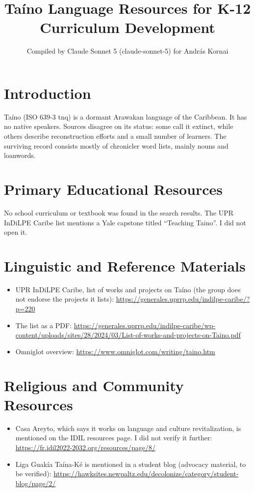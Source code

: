 \documentclass[12pt]{article}
\title{Ta\'ino Language Resources for K-12 Curriculum Development}
\author{Compiled by Claude Sonnet 5 (claude-sonnet-5) for Andr\'as Kornai}
\date{}
\begin{document}
\maketitle

\section{Introduction}
Ta\'ino (ISO 639-3 tnq) is a dormant Arawakan language of the Caribbean. It has no native speakers. Sources disagree on its status: some call it extinct, while others describe reconstruction efforts and a small number of learners. The surviving record consists mostly of chronicler word lists, mainly nouns and loanwords.

\section{Primary Educational Resources}
No school curriculum or textbook was found in the search results. The UPR InDiLPE Caribe list mentions a Yale capstone titled ``Teaching Taino''. I did not open it.

\section{Linguistic and Reference Materials}
\begin{itemize}
\item UPR InDiLPE Caribe, list of works and projects on Ta\'ino (the group does not endorse the projects it lists): \url{https://generales.uprrp.edu/indilpe-caribe/?p=220}
\item The list as a PDF: \url{https://generales.uprrp.edu/indilpe-caribe/wp-content/uploads/sites/28/2024/03/List-of-works-and-projects-on-Taino.pdf}
\item Omniglot overview: \url{https://www.omniglot.com/writing/taino.htm}
\end{itemize}

\section{Religious and Community Resources}
\begin{itemize}
\item Casa Areyto, which says it works on language and culture revitalization, is mentioned on the IDIL resources page. I did not verify it further: \url{https://fr.idil2022-2032.org/resources/page/8/}
\item Liga Guak\'ia Ta\'ina-K\'e is mentioned in a student blog (advocacy material, to be verified): \url{https://hawksites.newpaltz.edu/decolonize/category/student-blog/page/2/}
\end{itemize}
\end{document}
